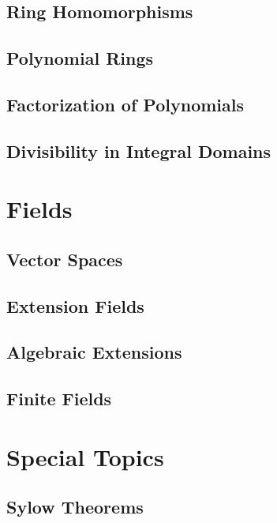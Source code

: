 \documentclass[a4paper, 12pt]{report}
\begin{document}
	\chapter{Ring Homomorphisms}
	
	
	\chapter{Polynomial Rings}
	
	
	\chapter{Factorization of Polynomials}
	
	
	\chapter{Divisibility in Integral Domains}
	
	
\part{Fields}
	\chapter{Vector Spaces}
	
	
	\chapter{Extension Fields}
	
	
	\chapter{Algebraic Extensions}
	
	
	\chapter{Finite Fields}
	
	
\part{Special Topics}
	\chapter{Sylow Theorems}
	
	
\end{document}
